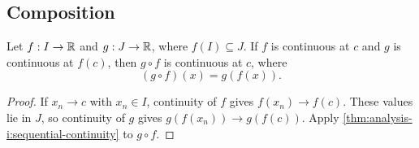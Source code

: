 \begin{marginfigure}
  \centering
  
  \caption[Selected values of Thomae's function.]{%
    Selected values of $T$ on $[0,1]$. Dots show all
    reduced fractions with denominator at most $8$. Larger denominators
    give smaller heights. Irrational inputs have value $0$. The finite
    drawing shows only part of the graph.}
  \label{fig:analysis-i:continuity-basic-thomae}
\end{marginfigure}

\subsection{Composition}

\begin{theorem}
  \label{thm:analysis-i:continuous-composition}
  Let $f:I\to\mathbb{R}$ and $g:J\to\mathbb{R}$, where $f(I)\subseteq J$.
  If $f$ is continuous at $c$ and $g$ is continuous at $f(c)$, then
  $g\circ f$ is continuous at $c$, where
  \[
    (g\circ f)(x)=g(f(x)).
  \]
\end{theorem}


\begin{proof}
  If $x_n\to c$ with $x_n\in I$, continuity of $f$ gives
  $f(x_n)\to f(c)$. These values lie in $J$, so continuity of $g$ gives
  $g(f(x_n))\to g(f(c))$. Apply
  \autoref{thm:analysis-i:sequential-continuity} to $g\circ f$.
\end{proof}



